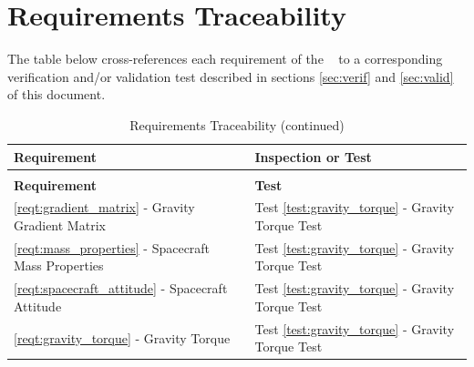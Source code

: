 \newpage


\section{Requirements Traceability}\label{sec:traceability}
The table below cross-references each requirement of the 
\gravitytorqueDesc\ 
to a corresponding verification and/or validation test
described in sections \ref{sec:verif} and \ref{sec:valid} of this document. 

\label{tab:reqt_ivv_xref}
\begin{longtable}[c]{||p{3.5in}|p{3.5in}|}
\caption{Requirements Traceability} \\[6pt]
\hline
{\bf Requirement} & {\bf Inspection or Test} \\ \hline \hline
\endfirsthead
\hline
\endfoot
\caption[]{Requirements Traceability (continued)} \\[6pt]
\hline
{\bf Requirement} & {\bf Test} \\ \hline \hline
\endhead

\ref{reqt:gradient_matrix} - Gravity Gradient Matrix &
  Test \ref{test:gravity_torque} - Gravity Torque Test \\ \hline

\ref{reqt:mass_properties} - Spacecraft Mass Properties &
  Test \ref{test:gravity_torque} - Gravity Torque Test \\ \hline

\ref{reqt:spacecraft_attitude} - Spacecraft Attitude &
  Test \ref{test:gravity_torque} - Gravity Torque Test \\ \hline

\ref{reqt:gravity_torque} - Gravity Torque &
  Test \ref{test:gravity_torque} - Gravity Torque Test \\ \hline

\end{longtable}








